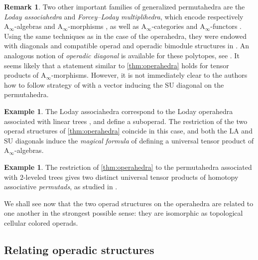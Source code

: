 \documentclass{amsart}
\theoremstyle{definition}
\newtheorem{example}[theorem]{Example}
\newtheorem{remark}[theorem]{Remark}
\newcommand{\SU}{\mathrm{SU}}
\newcommand{\LA}{\mathrm{LA}}
\newcommand{\Ainf}{\ensuremath{\mathrm{A}_\infty}}
\begin{document}
\begin{remark}
Two other important families of generalized permutahedra are the \emph{Loday associahedra} and \emph{Forcey--Loday multiplihedra}, which encode respectively $\Ainf$-algebras and $\Ainf$-morphisms \cite[Prop.~4.9]{MazuirLA22}, as well as $\Ainf$-categories and $\Ainf$-functors \cite[Sect.~4.3]{MazuirLA22}.
Using the same techniques as in the case of the operahedra, they were endowed with diagonals and compatible operad and operadic bimodule structures in \cite[Thm.~1]{MazuirLA22}.
An analogous notion of \emph{operadic diagonal} is available for these polytopes, see \cite[Prop.~2.14]{MazuirLA22}.
It seems likely that a statement similar to \cref{thm:operahedra} holds for tensor products of $\Ainf$-morphisms. 
However, it is not immediately clear to the authors how to follow strategy of \cite{MazuirLA22} with a vector inducing the $\SU$ diagonal on the permutahedra.
\end{remark}

\begin{example}
    The Loday associahedra correspond to the Loday operahedra associated with linear trees \cite[Sec. 2.2]{LA21}, and define a suboperad.
    The restriction of the two operad structures of \cref{thm:operahedra} coincide in this case, and both the $\LA$ and $\SU$ diagonals induce the \emph{magical formula} of \cite{MarklShnider06,masudaDiagonalAssociahedra2021,saneblidzeComparingDiagonalsAssociahedra2022} defining a universal tensor product of $\Ainf$-algebras. 
\end{example}

\begin{example}
    The restriction of \cref{thm:operahedra} to the permutahedra associated with $2$-leveled trees gives two distinct universal tensor products of homotopy associative \emph{permutads}, as studied in \cite{LodayRonco11,Markl19}.
\end{example}

We shall see now that the two operad structures on the operahedra are related to one another in the strongest possible sense: they are isomorphic as topological cellular colored operads.


\subsection{Relating operadic structures} 
\end{document}
